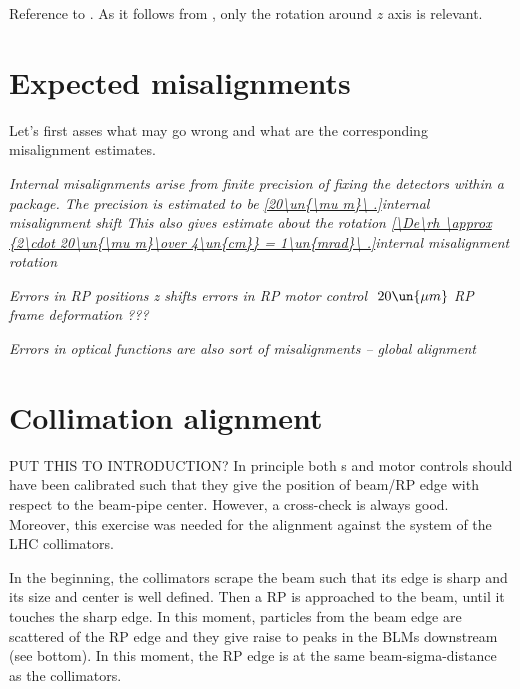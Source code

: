 Reference to .
As it follows from , only the rotation around $z$ axis is relevant.

\section[expected misalignments]{Expected misalignments}

Let's first asses what may go wrong and what are the corresponding misalignment estimates.

\noindent\em{Internal misalignments} arise from finite precision of fixing the detectors within a package. The precision is estimated to be
\eqref{20\un{\mu m}\ .}{internal misalignment shift}
This also gives estimate about the rotation
\eqref{\De\rh \approx {2\cdot 20\un{\mu m}\over 4\un{cm}} = 1\un{mrad}\ .}{internal misalignment rotation}

\noindent\em{Errors in RP positions}
\> z shifts
\> errors in RP motor control $~20\un{\mu m}$
\> RP frame deformation ???

\noindent\em{Errors in optical functions} are also sort of misalignments -- global alignment


\section{Collimation alignment}

PUT THIS TO INTRODUCTION? In principle both s and  motor controls should have been calibrated such that they give the position of beam/RP edge with respect to the beam-pipe center. However, a cross-check is always good. Moreover, this exercise was needed for the alignment against the system of the LHC collimators.

In the beginning, the collimators scrape the beam such that its edge is sharp and its size and center is well defined. Then a RP is approached to the beam, until it touches the sharp edge. In this moment, particles from the beam edge are scattered of the RP edge and they give raise to peaks in the BLMs downstream (see  bottom). In this moment, the RP edge is at the same beam-sigma-distance as the collimators.

